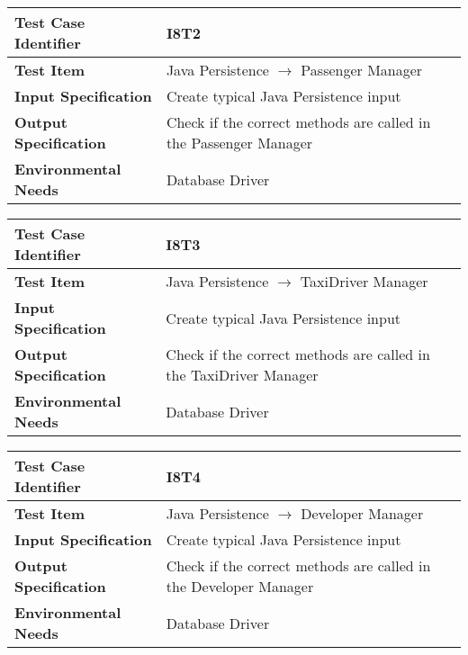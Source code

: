 \begin{table}[!htbp]
\begin{center}
\begin{tabular}[t]{p{}p{}}

\hline
\textbf{Test Case Identifier} & I8T2 \\
\hline
\textbf{Test Item} & Java Persistence $\rightarrow$ Passenger Manager \\
\hline
\textbf{Input Specification} & Create typical Java Persistence input \\
\hline
\textbf{Output Specification} & Check if the correct methods are called in the Passenger Manager \\
\hline
\textbf{Environmental Needs} & Database Driver \\
\hline

\end{tabular}
\end{center}
\end{table}

\begin{table}[!htbp]
\begin{center}
\begin{tabular}[t]{p{}p{}}

\hline
\textbf{Test Case Identifier} & I8T3 \\
\hline
\textbf{Test Item} & Java Persistence $\rightarrow$ TaxiDriver Manager \\
\hline
\textbf{Input Specification} & Create typical Java Persistence input \\
\hline
\textbf{Output Specification} & Check if the correct methods are called in the TaxiDriver Manager \\
\hline
\textbf{Environmental Needs} & Database Driver \\
\hline

\end{tabular}
\end{center}
\end{table}

\begin{table}[!htbp]
\begin{center}
\begin{tabular}[t]{p{}p{}}

\hline
\textbf{Test Case Identifier} & I8T4 \\
\hline
\textbf{Test Item} & Java Persistence $\rightarrow$ Developer Manager \\
\hline
\textbf{Input Specification} & Create typical Java Persistence input \\
\hline
\textbf{Output Specification} & Check if the correct methods are called in the Developer Manager \\
\hline
\textbf{Environmental Needs} & Database Driver \\
\hline

\end{tabular}
\end{center}
\end{table}

